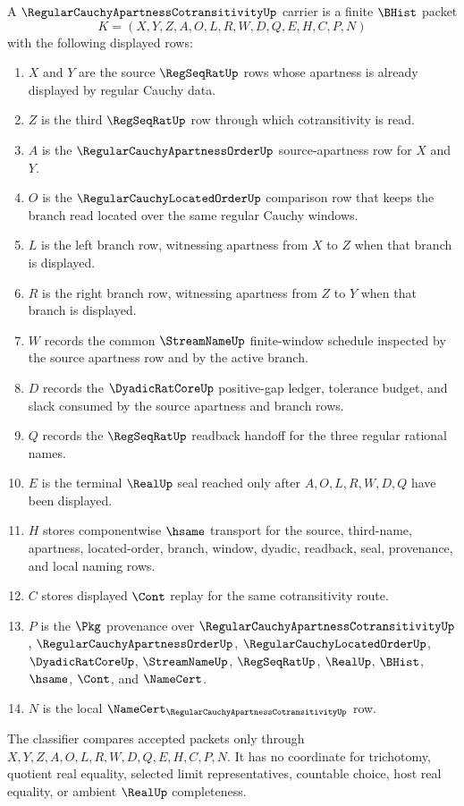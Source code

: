 \begin{definition}
\label{def:regular-cauchy-apartness-cotransitivity-carrier}
A $\RegularCauchyApartnessCotransitivityUp$ carrier is a finite $\BHist$ packet
$$
K=(X,Y,Z,A,O,L,R,W,D,Q,E,H,C,P,N)
$$
with the following displayed rows:
\begin{enumerate}
\item $X$ and $Y$ are the source $\RegSeqRatUp$ rows whose apartness is already displayed by regular Cauchy data.
\item $Z$ is the third $\RegSeqRatUp$ row through which cotransitivity is read.
\item $A$ is the $\RegularCauchyApartnessOrderUp$ source-apartness row for $X$ and $Y$.
\item $O$ is the $\RegularCauchyLocatedOrderUp$ comparison row that keeps the branch read located over the same regular Cauchy windows.
\item $L$ is the left branch row, witnessing apartness from $X$ to $Z$ when that branch is displayed.
\item $R$ is the right branch row, witnessing apartness from $Z$ to $Y$ when that branch is displayed.
\item $W$ records the common $\StreamNameUp$ finite-window schedule inspected by the source apartness row and by the active branch.
\item $D$ records the $\DyadicRatCoreUp$ positive-gap ledger, tolerance budget, and slack consumed by the source apartness and branch rows.
\item $Q$ records the $\RegSeqRatUp$ readback handoff for the three regular rational names.
\item $E$ is the terminal $\RealUp$ seal reached only after $A,O,L,R,W,D,Q$ have been displayed.
\item $H$ stores componentwise $\hsame$ transport for the source, third-name, apartness, located-order, branch, window, dyadic, readback, seal, provenance, and local naming rows.
\item $C$ stores displayed $\Cont$ replay for the same cotransitivity route.
\item $P$ is the $\Pkg$ provenance over $\RegularCauchyApartnessCotransitivityUp$, $\RegularCauchyApartnessOrderUp$, $\RegularCauchyLocatedOrderUp$, $\DyadicRatCoreUp$, $\StreamNameUp$, $\RegSeqRatUp$, $\RealUp$, $\BHist$, $\hsame$, $\Cont$, and $\NameCert$.
\item $N$ is the local $\NameCert_{\RegularCauchyApartnessCotransitivityUp}$ row.
\end{enumerate}
The classifier compares accepted packets only through $X,Y,Z,A,O,L,R,W,D,Q,E,H,C,P,N$. It has no coordinate for trichotomy, quotient real equality, selected limit representatives, countable choice, host real equality, or ambient $\RealUp$ completeness.
\end{definition}

